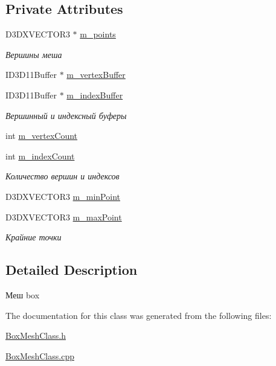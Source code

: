 \subsection*{Private Attributes}
\begin{DoxyCompactItemize}
\item 
D3\+D\+X\+V\+E\+C\+T\+O\+R3 $\ast$ \hyperlink{group___meshes_ga04b0eafbdb4f2d3c1120b4c85c47dff7}{m\+\_\+points}
\begin{DoxyCompactList}\small\item\em Вершины меша \end{DoxyCompactList}\item 
I\+D3\+D11\+Buffer $\ast$ \hyperlink{group___meshes_gad50671a0a83027a1d379e67a051236b7}{m\+\_\+vertex\+Buffer}
\item 
I\+D3\+D11\+Buffer $\ast$ \hyperlink{group___meshes_ga181b814ab05f1f13665a1130ff321db5}{m\+\_\+index\+Buffer}
\begin{DoxyCompactList}\small\item\em Вершинный и индексный буферы \end{DoxyCompactList}\item 
int \hyperlink{group___meshes_ga60b85c9577c5a4a1eb77f358175234d7}{m\+\_\+vertex\+Count}
\item 
int \hyperlink{group___meshes_gad0398a4877027fd866fa758fb39a7f69}{m\+\_\+index\+Count}
\begin{DoxyCompactList}\small\item\em Количество вершин и индексов \end{DoxyCompactList}\item 
D3\+D\+X\+V\+E\+C\+T\+O\+R3 \hyperlink{group___meshes_ga01a788e0dd748680e15b4b23fee416f7}{m\+\_\+min\+Point}
\item 
D3\+D\+X\+V\+E\+C\+T\+O\+R3 \hyperlink{group___meshes_ga30b105502d84acfeb2e709ef801726b5}{m\+\_\+max\+Point}
\begin{DoxyCompactList}\small\item\em Крайние точки \end{DoxyCompactList}\end{DoxyCompactItemize}


\subsection{Detailed Description}
Меш box 

The documentation for this class was generated from the following files\+:\begin{DoxyCompactItemize}
\item 
\hyperlink{_box_mesh_class_8h}{Box\+Mesh\+Class.\+h}\item 
\hyperlink{_box_mesh_class_8cpp}{Box\+Mesh\+Class.\+cpp}\end{DoxyCompactItemize}
